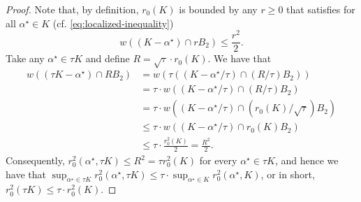 \documentclass[10pt,a4paper]{amsart}
\newcommand{\alphastar}{\alpha^\star}
\newcommand{\pr}[1]{\left(#1\right)}
\newcommand{\rzero}[0]{r_{0}}
\begin{document}
\begin{proof}
    Note that, by definition, $\rzero(K)$ is bounded by any $r\geq 0$ that satisfies for all $\alphastar \in K$ (cf. \eqref{eq:localized-inequality})
\begin{equation*}
     w\pr{(K-\alphastar)\cap rB_2}\leq \frac{r^2}{2}.
\end{equation*}
Take any $\alphastar \in \tau K$ and define $R = \sqrt{\tau} \cdot \rzero(K)$. We have that
\begin{align*}
    w\pr{(\tau K-\alphastar)\cap RB_2} &= w\pr{\tau \pr{( K-\alphastar/\tau)\cap (R/\tau) B_2}}\\
    &=\tau \cdot w\pr{( K-\alphastar/\tau)\cap (R/\tau) B_2} \\
    &= \tau \cdot w\pr{( K-\alphastar/\tau)\cap (\rzero(K)/\sqrt{\tau}) B_2} \\
    &\leq \tau \cdot w\pr{( K-\alphastar/\tau)\cap \rzero(K) B_2} \\
    &\leq \tau \cdot \frac{\rzero^2(K)}{2} = \frac{R^2}{2}.
\end{align*}
Consequently, $\rzero^2(\alphastar,\tau K)\leq R^2 = \tau \rzero^2(K)$ for every $\alphastar\in \tau K$, and hence we have that $\sup_{\alphastar \in \tau K}\rzero^2(\alphastar, \tau K)\leq \tau \cdot \sup_{\alphastar \in K}\rzero^2(\alphastar, K)$, or in short, $\rzero^2(\tau K) \leq \tau \cdot \rzero^2(K)$.
\end{proof}
\end{document}
